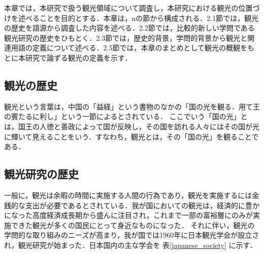 \documentclass{jsarticle}
\begin{document}
本章では，本研究で扱う観光領域について調査し，本研究における観光の位置づけを述べることを目的とする．本章は，nの節から構成される．2.1節では，観光の歴史を語源から調査した内容を述べる．2.2節では，比較的新しい学問である観光研究の歴史をひもとく．2.3節では，歴史的背景，学問的背景から観光と関連用語の定義について述べる．2.5節では，本章のまとめとして観光の概観をもとに本研究で論ずる観光の定義を示す．

\newpage

\subsection{観光の歴史}

観光という言葉は，中国の「益経」という書物のなかの「国の光を観る．用て王の賓たるに利し」という一節によるとされている．\cite{kanko_define}
ここでいう「国の光」とは，国王の人徳と善政によって国が反映し，その国を訪れる人々にはその国が光に輝いて見えることをいう．すなわち，観光とは，その「国の光」を観ることである．

\subsection{観光研究の歴史}

一般に，観光は余暇の時間に実施する人間の行為であり，観光を実施するには金銭的な支出が必要であるとされている．我が国においての観光は，経済的に豊かになった高度経済成長期から盛んに注目され，これまで一部の富裕層にのみが実施できた観光が多くの国民にとって身近なものになった．
それに伴い，観光の学問的な取り組みのニーズが高まり，我が国では1960年に日本観光学会が設立され，観光研究が始まった．日本国内の主な学会を 表\ref{japanese_society} に示す．
\end{document}
